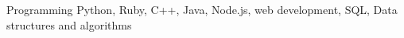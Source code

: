 

\begin{cvskills}

  \cvskill
    {Programming} %
    {Python, Ruby, C++, Java, Node.js, web development, SQL, Data structures and algorithms} %
    
\end{cvskills}
